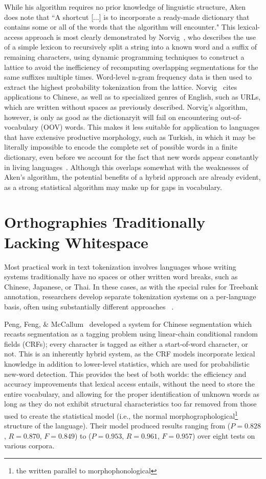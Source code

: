 While his algorithm requires no prior knowledge of linguistic structure, Aken~\cite{aken11} does note that ``A shortcut [...] is to incorporate a ready-made dictionary that contains some or all of the words that the algorithm will encounter." This lexical-access approach is most clearly demonstrated by Norvig~\cite{norvig14}, who describes the use of a simple lexicon to recursively split a string into a known word and a suffix of remaining characters, using dynamic programming techniques to construct a lattice to avoid the inefficiency of recomputing overlapping segmentations for the same suffixes multiple times. Word-level n-gram frequency data is then used to extract the highest probability tokenization from the lattice. Norvig~\cite{norvig14} cites applications to Chinese, as well as to specialized genres of English, such as URLs, which are written without spaces as previously described.
Norvig's algorithm, however, is only as good as the dictionary\textemdash it will fail on encountering out-of-vocabulary (OOV) words. This makes it less suitable for application to languages that have extensive productive morphology, such as Turkish, in which it may be literally impossible to encode the complete set of possible words in a finite dictionary, even before we account for the fact that new words appear constantly in living languages~\cite{islam07}. Although this overlaps somewhat with the weaknesses of Aken's algorithm, the potential benefits of a hybrid approach are already evident, as a strong statistical algorithm may make up for gaps in vocabulary.

\section{Orthographies Traditionally Lacking Whitespace}
Most practical work in text tokenization involves languages whose writing systems traditionally have no spaces or other written word breaks, such as Chinese, Japanese, or Thai. In these cases, as with the special rules for Treebank annotation, researchers develop separate tokenization systems on a per-language basis, often using substantially different approaches ~\cite{peng04}\cite{suzuki00}.

Peng, Feng, \& McCallum~\cite{peng04} developed a system for Chinese segmentation which recasts segmentation as a tagging problem using linear-chain conditional random fields (CRFs); every character is tagged as either a start-of-word character, or not. This is an inherently hybrid system, as the CRF models incorporate lexical knowledge in addition to lower-level statistics, which are used for probabilistic new-word detection. This provides the best of both worlds: the efficiency and accuracy improvements that lexical access entails, without the need to store the entire vocabulary, and allowing for the proper identification of unknown words as long as they do not exhibit structural characteristics too far removed from those used to create the statistical model (i.e., the normal morphographological\footnote{the written parallel to morphophonological} structure of the language). Their model produced results ranging from ($P = 0.828$, $R = 0.870$, $F = 0.849$) to ($P = 0.953$, $R = 0.961$, $F = 0.957$) over eight tests on various corpora.

